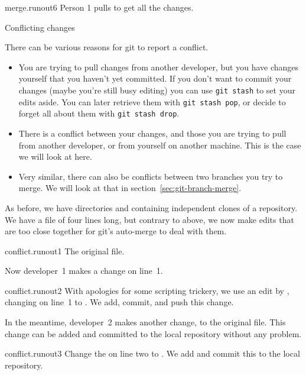 \begin{gitstep}{merge.runout6}
  Person 1 pulls to get all the changes.
\end{gitstep}

 {Conflicting changes}
\label{sec:git-conflict}

There can be various reasons for git to report a conflict.
\begin{itemize}
\item You are trying to pull changes from another developer, but you have changes
  yourself that you haven't yet committed.
  If you don't want to commit your changes
  (maybe you're still busy editing)
  you can use \lstinline{git stash} to set your edits aside.
  You can later retrieve them with \lstinline{git stash pop},
  or decide to forget all about them with \lstinline{git stash drop}.
\item There is a conflict between your changes, and those you are trying to pull
  from another developer, or from yourself on another machine.
  This is the case we will look at here.
\item Very similar, there can also be conflicts between two branches you try to merge.
  We will look at that in section~\ref{sec:git-branch-merge}.
\end{itemize}

As before, we have directories  and 
containing independent clones of a repository.
We have a file of four lines long, but contrary to above,
we now make edits that are too close together for git's
auto-merge to deal with them.

\begin{gitstep}{conflict.runout1}
  The original file.
\end{gitstep}

Now developer~1 makes a change on line~1.

\begin{gitstep}{conflict.runout2}
  With apologies for some scripting trickery,
  we use an edit by , changing  on line~1 to .
  We add, commit, and push this change.
\end{gitstep}

In the meantime, developer~2 makes another change, to the original file.
This change can be added and committed to the local repository
without any problem.

\begin{gitstep}{conflict.runout3}
  Change the  on line two to .
  We add and commit this to the local repository.
\end{gitstep}

